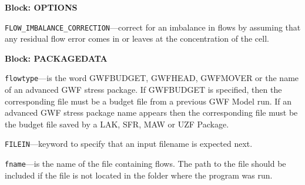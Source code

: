 
\item \textbf{Block: OPTIONS}

\begin{description}
\item \texttt{FLOW\_IMBALANCE\_CORRECTION}---correct for an imbalance in flows by assuming that any residual flow error comes in or leaves at the concentration of the cell.

\end{description}
\item \textbf{Block: PACKAGEDATA}

\begin{description}
\item \texttt{flowtype}---is the word GWFBUDGET, GWFHEAD, GWFMOVER or the name of an advanced GWF stress package.  If GWFBUDGET is specified, then the corresponding file must be a budget file from a previous GWF Model run.  If an advanced GWF stress package name appears then the corresponding file must be the budget file saved by a LAK, SFR, MAW or UZF Package.

\item \texttt{FILEIN}---keyword to specify that an input filename is expected next.

\item \texttt{fname}---is the name of the file containing flows.  The path to the file should be included if the file is not located in the folder where the program was run.

\end{description}

